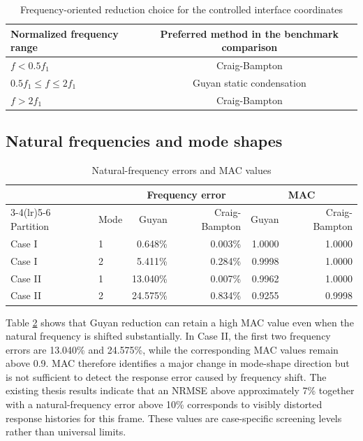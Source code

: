 \documentclass[11pt,a4paper]{article}
\begin{document}
\begin{table}[htbp]
\centering
\caption{Frequency-oriented reduction choice for the controlled interface coordinates}
\label{tab:selectionband}
\begin{tabular}{lc}
\toprule
Normalized frequency range & Preferred method in the benchmark comparison\\
\midrule
$f<0.5f_1$ & Craig-Bampton\\
$0.5f_1\leq f\leq2f_1$ & Guyan static condensation\\
$f>2f_1$ & Craig-Bampton\\
\bottomrule
\end{tabular}
\end{table}

\subsection{Natural frequencies and mode shapes}

\begin{table}[htbp]
\centering
\caption{Natural-frequency errors and MAC values}
\label{tab:modalmetrics}
\small
\begin{tabular}{llrrrr}
\toprule
& & \multicolumn{2}{c}{Frequency error} & \multicolumn{2}{c}{MAC}\\
\cmidrule(lr){3-4}\cmidrule(lr){5-6}
Partition & Mode & Guyan & Craig-Bampton & Guyan & Craig-Bampton\\
\midrule
Case I & 1 & 0.648\% & 0.003\% & 1.0000 & 1.0000\\
Case I & 2 & 5.411\% & 0.284\% & 0.9998 & 1.0000\\
Case II & 1 & 13.040\% & 0.007\% & 0.9962 & 1.0000\\
Case II & 2 & 24.575\% & 0.834\% & 0.9255 & 0.9998\\
\bottomrule
\end{tabular}
\end{table}

Table \ref{tab:modalmetrics} shows that Guyan reduction can retain a high MAC value even when the natural frequency is shifted substantially. In Case II, the first two frequency errors are 13.040\% and 24.575\%, while the corresponding MAC values remain above 0.9. MAC therefore identifies a major change in mode-shape direction but is not sufficient to detect the response error caused by frequency shift. The existing thesis results indicate that an NRMSE above approximately 7\% together with a natural-frequency error above 10\% corresponds to visibly distorted response histories for this frame. These values are case-specific screening levels rather than universal limits.
\end{document}
